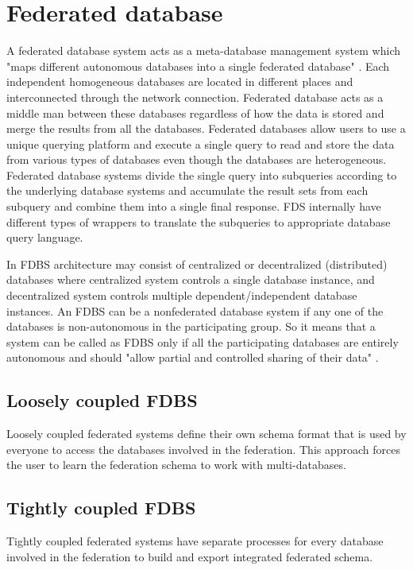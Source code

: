 	\section{Federated database}
	
	A federated database system acts as a meta-database management system which "maps different autonomous databases into a single federated database" \cite{misc10}.  Each independent homogeneous databases are located in different places and interconnected through the network connection. Federated database acts as a middle man between these databases regardless of how the data is stored and merge the results from all the databases. Federated databases allow users to use a unique querying platform and execute a single query to read and store the data from various types of databases even though the databases are heterogeneous. Federated database systems divide the single query into subqueries according to the underlying database systems and accumulate the result sets from each subquery and combine them into a single final response.  FDS internally have different types of wrappers to translate the subqueries to appropriate database query language.
	
	In FDBS architecture may consist of centralized or decentralized (distributed) databases where centralized system controls a single database instance, and decentralized system controls multiple dependent/independent database instances. An FDBS can be a nonfederated database system if any one of the databases is non-autonomous in the participating group. So it means that a system can be called as FDBS only if all the participating databases are entirely autonomous and should "allow partial and controlled sharing of their data" \cite{misc10}.
	
	\subsection{Loosely coupled FDBS}
	
	Loosely coupled federated systems define their own schema format that is used by everyone to access the databases involved in the federation. This approach forces the user to learn the federation schema to work with multi-databases.

	\subsection{Tightly coupled FDBS}
	
	Tightly coupled federated systems have separate processes for every database involved in the federation to build and export integrated federated schema.
	
